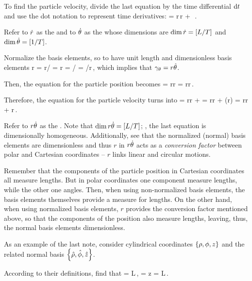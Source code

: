 To find the particle velocity, divide the last equation by the time differential $\text{d} t$ and use the dot notation to represent time derivatives:
\beq
\dt\pvec = \dt r\,\ifvec r + \dt\theta\,\ifvec\theta\,.
\eeq

Refer to $\dot{r}$ as the  and to $\dot{\theta}$ as the  whose dimensions are $\dim{\dot{r}} = \left[{L/T}\right]$ and $\dim{\dot{\theta}} = \left[{1/T}\right]$.

Normalize the basis elements, so to have unit length and dimensionless basis elements
\beq
\nvec r = \ifvec r/ = \ifvec r\quad{}\quad
\nvec \theta = \ifvec\theta/\magn{\ifvec\theta} = \ifvec\theta/r\,,
\eeq
which implies that $\gamma_{\theta} = r\hat{\theta}$.

Then, the equation for the particle position becomes
\beq
\pvec = r\ifvec r = r\nvec r\,.
\eeq

Therefore, the equation for the particle velocity turns into
\beq
\dt\pvec = \dt r\ifvec r + \dt\theta\ifvec\theta 
         = \dt r\nvec r + \dt\theta(r\nvec\theta)
         = \dt r\nvec r + r\dt\theta\nvec\theta\,.
\eeq

Refer to $r\dot{\theta}$ as the . Note that $\dim{r\dot{\theta}} = \left[{L/T}\right]$; \ie, the last equation is dimensionally homogeneous. Additionally, see that the normalized (normal) basis elements are dimensionless and thus $r$ in $r\dot{\theta}$ acts as a \emph{conversion factor} between polar and Cartesian coordinates -- $r$ links linear and circular motions.

\begin{note}
Remember that the components of the particle position in Cartesian coordinates all measure lengths. But in polar coordinates one component measure lengths, while the other one angles. Then, when using non-normalized basis elements, the basis elements themselves provide a measure for lengths. On the other hand, when using normalized basis elements, $r$ provides the conversion factor mentioned above, so that the components of the position also measure lengths, leaving, thus, the normal basis elements dimensionless.
\end{note}

As an example of the last note, consider cylindrical coordinates $\left\lbrace{\rho, \phi, z}\right\rbrace$ and the related normal basis $\left\lbrace{\hat{\rho}, \hat{\phi}, \hat{z}}\right\rbrace$. 

According to their definitions, find that
\beq
\dim\rho = \phdim L\,,\quad
\dim\phi = \quad{}\quad
\dim z = \phdim L\,.
\eeq

